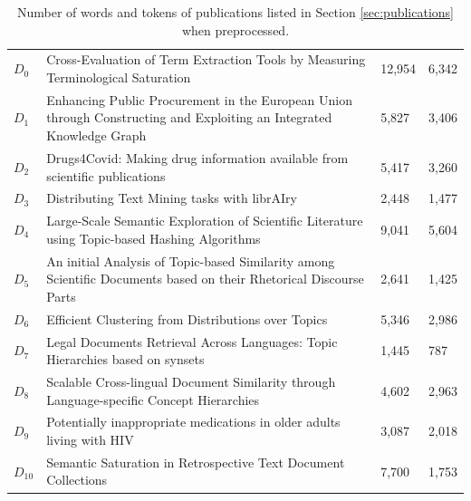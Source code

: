 \begin{table}[!htbp]
\centering%
\begin{tabularx}{\linewidth}{lHll}
\toprule
{} &  &  &  \\
\midrule
\midrule
$D_0$ & Cross-Evaluation of Term Extraction Tools by Measuring Terminological Saturation & 12,954 & 6,342 \\
\midrule
$D_1$ & Enhancing Public Procurement in the European Union through Constructing and Exploiting an Integrated Knowledge Graph & 5,827 & 3,406 \\
\midrule
$D_2$ & Drugs4Covid: Making drug information available from scientific publications & 5,417 & 3,260 \\
\midrule
$D_3$ & Distributing Text Mining tasks with librAIry & 2,448 & 1,477 \\
\midrule
$D_4$ & Large-Scale Semantic Exploration of Scientific Literature using Topic-based Hashing Algorithms & 9,041 & 5,604 \\
\midrule
$D_5$ & An initial Analysis of Topic-based Similarity among Scientific Documents based on their Rhetorical Discourse Parts & 2,641 & 1,425 \\
\midrule
$D_6$ & Efficient Clustering from Distributions over Topics & 5,346 & 2,986 \\
\midrule
$D_7$ & Legal Documents Retrieval Across Languages: Topic Hierarchies based on synsets & 1,445 & 787 \\
\midrule
$D_8$ & Scalable Cross-lingual Document Similarity through Language-specific Concept Hierarchies & 4,602 & 2,963 \\
\midrule
$D_9$ & Potentially inappropriate medications in older adults living with HIV & 3,087 & 2,018 \\
\midrule
$D_{10}$ & Semantic Saturation in Retrospective Text Document Collections & 7,700 & 1,753 \\
\midrule
\bottomrule
\end{tabularx}
\caption{Number of words and tokens of publications listed in Section \ref{sec:publications} when preprocessed.}
\label{table:ir-collection}
\end{table}



